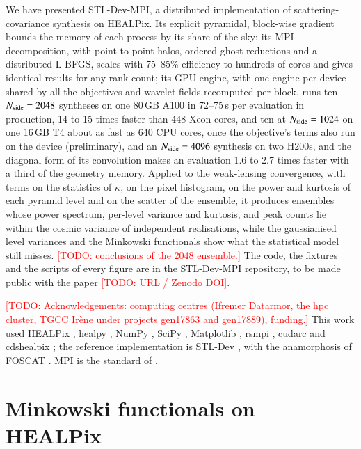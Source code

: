 \documentclass{aa}
\newcommand{\todo}[1]{\textcolor{red}{[TODO: #1]}}
\newcommand{\nside}{N_{\rm side}}
\begin{document}
We have presented STL-Dev-MPI, a distributed implementation of scattering-covariance synthesis on HEALPix. Its explicit pyramidal, block-wise gradient bounds the memory of each process by its share of the sky; its MPI decomposition, with point-to-point halos, ordered ghost reductions and a distributed L-BFGS, scales with 75--85\% efficiency to hundreds of cores and gives identical results for any rank count; its GPU engine, with one engine per device shared by all the objectives and wavelet fields recomputed per block, runs ten $\nside=2048$ syntheses on one 80\,GB A100 in 72--75\,s per evaluation in production, 14 to 15 times faster than 448 Xeon cores, and ten at $\nside=1024$ on one 16\,GB T4 about as fast as 640 CPU cores, once the objective's terms also run on the device (preliminary), and an $\nside=4096$ synthesis on two H200s, and the diagonal form of its convolution makes an evaluation 1.6 to 2.7 times faster with a third of the geometry memory. Applied to the weak-lensing convergence, with terms on the statistics of $\kappa$, on the pixel histogram, on the power and kurtosis of each pyramid level and on the scatter of the ensemble, it produces ensembles whose power spectrum, per-level variance and kurtosis, and peak counts lie within the cosmic variance of independent realisations, while the gaussianised level variances and the Minkowski functionals show what the statistical model still misses. %
\todo{conclusions of the 2048 ensemble.} The code, the fixtures and the scripts of every figure are in the STL-Dev-MPI repository, to be made public with the paper \todo{URL / Zenodo DOI}.

\begin{acknowledgements}
\todo{Acknowledgements: computing centres (Ifremer Datarmor, the hpc cluster, TGCC Ir\`ene under projects gen17863 and gen17889), funding.} This work used HEALPix \citep{gorski2005}, healpy \citep{zonca2019}, NumPy \citep{harris2020}, SciPy \citep{virtanen2020}, Matplotlib \citep{hunter2007}, rsmpi \citep{rsmpi}, cudarc \citep{cudarc} and cdshealpix \citep{cdshealpix}; the reference implementation is STL-Dev \citep{stldev}, with the anamorphosis of FOSCAT \citep{foscat}. MPI is the standard of \citet{mpi41}.
\end{acknowledgements}




\appendix

\section{Minkowski functionals on HEALPix}
\label{app:minkowski}
\end{document}
